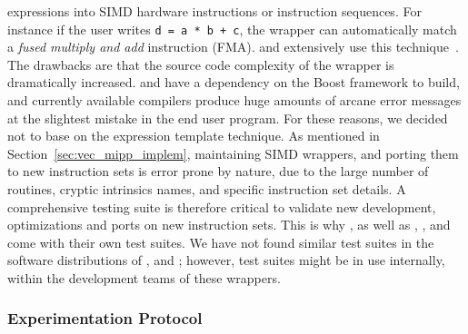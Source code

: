 expressions into SIMD hardware instructions or instruction sequences. For
instance if the user writes \verb|d = a * b + c|, the wrapper can automatically
match a \emph{fused multiply and add} instruction (FMA). \BoostSIMD and \bSIMD
extensively use this technique~\cite{Esterie2012,Esterie2012a}. The drawbacks
are that the source code complexity of the wrapper is dramatically increased.
\BoostSIMD and \bSIMD have a dependency on the Boost framework to build, and
currently available \Cxx compilers produce huge amounts of arcane error messages
at the slightest mistake in the end user program. For these reasons, we decided
not to base \MIPP on the expression template technique. As mentioned in
Section~\ref{sec:vec_mipp_implem}, maintaining SIMD wrappers, and porting them
to new instruction sets is error prone by nature, due to the large number of
routines, cryptic intrinsics names, and specific instruction set details. A
comprehensive testing suite is therefore critical to validate new development,
optimizations and ports on new instruction sets. This is why \MIPP, as well as
\Vc, \BoostSIMD, \simdpp and \bSIMD come with their own test suites. We have not
found similar test suites in the software distributions of \VCL, \xsimd and
\TSIMD; however, test suites might be in use internally, within the development
teams of these wrappers.

\subsubsection{Experimentation Protocol}
\label{opt:mipp_protocol}

